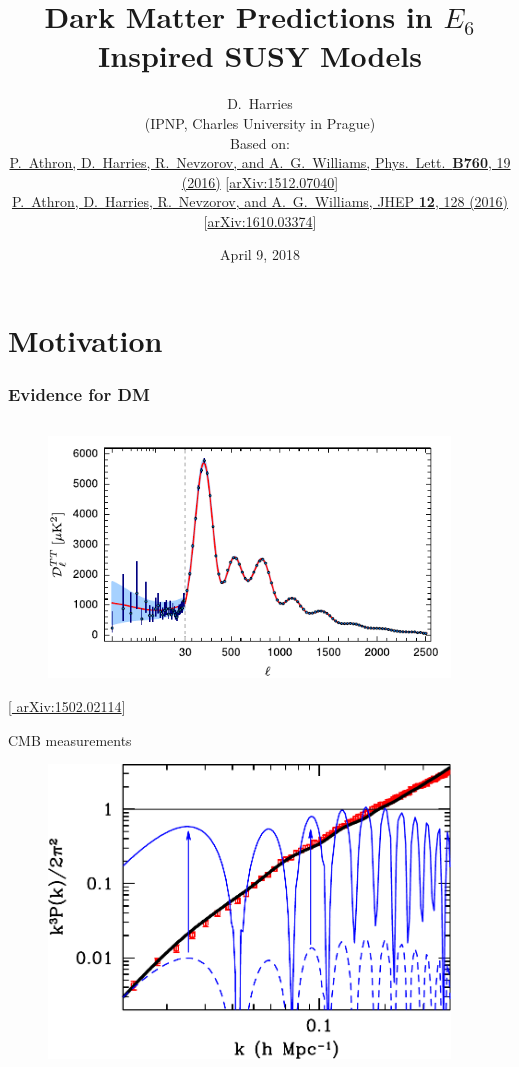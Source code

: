 \documentclass[10pt,aspectratio=169]{beamer}
\title{Dark Matter Predictions in $E_6$ Inspired SUSY Models}
\author{D.~Harries\\
  {\scriptsize
    (IPNP, Charles University in Prague)}\\
  \vspace{25pt}
  { \scriptsize
    Based on:\\[3mm]
  }
  { \tiny
    \href{https://doi.org/10.1016/j.physletb.2016.06.040}{%
      P.~Athron, D.~Harries, R.~Nevzorov, and A.~G.~Williams,
      Phys.~Lett.~\textbf{B760}, 19 (2016)}
         [\href{https://arxiv.org/abs/1512.07040}{arXiv:1512.07040}]\\[1mm]
    \href{https://doi.org/10.1007/JHEP12(2016)128}{%
      P.~Athron, D.~Harries, R.~Nevzorov, and A.~G.~Williams,
      JHEP \textbf{12}, 128 (2016)}
         [\href{https://arxiv.org/abs/1610.03374}{arXiv:1610.03374}]
  }
}
\date[\'{U}TF, Charles University in Prague]{April 9, 2018}
\begin{document}
\begin{frame}[plain]
  \titlepage
\end{frame}

\section{Motivation}

\begin{frame}
  \frametitle{Evidence for DM}
  \begin{columns}[t]
    \begin{column}{0.3\textwidth}
      \vspace*{-20pt}
      \begin{figure}
        \centering
        \includegraphics[width=0.95\textwidth]{cmb_power_spectrum}
      \end{figure}
      \vspace*{-25pt}
      \begin{center}
        { \tiny [\href{http://arxiv.org/abs/1502.02114}{%
              arXiv:1502.02114}] }
      \end{center}
      \vspace*{-20pt}
      \begin{center}
        CMB measurements
      \end{center}
      \vspace*{-15pt}
      \begin{figure}
        \centering
        \includegraphics[width=0.95\textwidth]{matter_power_spectrum}

\end{figure}
\end{column}
\end{columns}
\end{frame}
\end{document}

